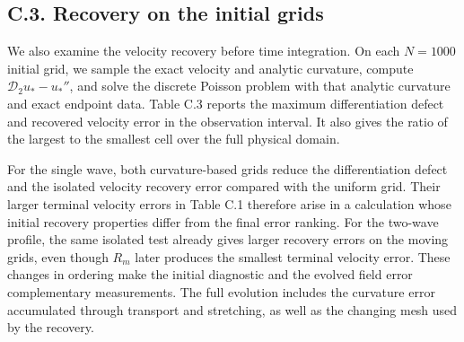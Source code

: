 \subsection*{C.3. Recovery on the initial grids}

We also examine the velocity recovery before time integration. On each \(N=1000\) initial grid, we sample the exact velocity and analytic curvature, compute \(\mathcal D_2u_*-u_*''\), and solve the discrete Poisson problem with that analytic curvature and exact endpoint data. Table C.3 reports the maximum differentiation defect and recovered velocity error in the observation interval. It also gives the ratio of the largest to the smallest cell over the full physical domain.


For the single wave, both curvature-based grids reduce the differentiation defect and the isolated velocity recovery error compared with the uniform grid. Their larger terminal velocity errors in Table C.1 therefore arise in a calculation whose initial recovery properties differ from the final error ranking. For the two-wave profile, the same isolated test already gives larger recovery errors on the moving grids, even though \(R_m\) later produces the smallest terminal velocity error. These changes in ordering make the initial diagnostic and the evolved field error complementary measurements. The full evolution includes the curvature error accumulated through transport and stretching, as well as the changing mesh used by the recovery.

